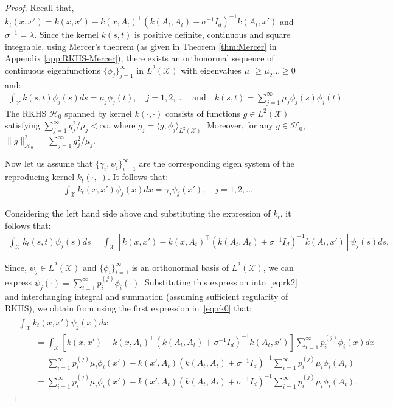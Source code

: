 \documentclass[final,12pt]{colt2026} %
\begin{document}
\begin{proof}
Recall  that, $k_t(x,x')= k(x,x')- k(x,A_t)^\top (k(A_t,A_t)+\sigma^{-1} I_d)^{-1} k(A_t,x')$ and $\sigma^{-1}= \lambda$.  Since the kernel $k(s,t)$ is positive definite, continuous and square integrable, using Mercer's theorem (as given in Theorem \ref{thm:Mercer} in Appendix \ref{app:RKHS-Mercer}), there exists an orthonormal sequence of continuous eigenfunctions $\{\phi_j\}_{j=1}^{\infty}$ in $L^2(\mathcal X)$ with eigenvalues $\mu_1\geq \mu_2\ldots \geq 0$ and:
\begin{align}
    \int_{\mathcal X} k(s,t)\phi_j(s)ds= \mu_j \phi_j(t), \quad j={1,2,\ldots} \quad \text{and} \quad k(s,t)= \sum_{j=1}^{\infty} \mu_j \phi_j(s)\phi_j(t).
    \label{eq:rk0}
\end{align} 
The RKHS $\mathcal H_0$ spanned by kernel $k(\cdot,\cdot)$ consists of functions $g\in L^2(\mathcal X)$ satisfying $\sum_{j=1}^{\infty}{g_j^2}/{\mu_j} < \infty$, where $g_j= \langle g, \phi_j\rangle_{L^2(\mathcal X)}$. Moreover, for any $g\in\mathcal H_0$,  $\|g\|_{\mathcal H_0}^2 = \sum_{j=1}^{\infty}{g_j^2}/{\mu_j}$.

Now let us assume that $\{\gamma_i,\psi_i\}_{i=1}^{\infty}$ are the corresponding eigen system of the reproducing kernel $k_t(\cdot,\cdot)$. It follows that:
\begin{align}
    \int_{\mathcal X} k_t(x,x')\psi_j(x)dx= \gamma_j \psi_j(x'), \quad j={1,2,\ldots}
    \label{eq:rk1}
\end{align}

Considering the left hand side above and substituting the expression of $k_t$, it follows that:
\begin{align}
    \int_{\mathcal X} k_t(s,t)\psi_j(s)ds = \int_{\mathcal X} \left[k(x,x')- k(x,A_t)^\top (k(A_t,A_t)+\sigma^{-1} I_d)^{-1} k(A_t,x')\right]\psi_j(s)ds.
    \label{eq:rk2}
\end{align}

Since, $\psi_j \in L^2(\mathcal X)$ and $\{\phi_i\}_{i=1}^{\infty}$ is an orthonormal basis of $L^2(\mathcal X)$, we can express $\psi_j(\cdot) = \sum_{i=1}^{\infty} p^{(j)}_i  \phi_i(\cdot) $. Substituting this expression into~\eqref{eq:rk2} and interchanging integral and summation (assuming sufficient regularity of RKHS), we obtain from using the first expression in~\eqref{eq:rk0} that:
\begin{align}\label{eq:rk3}
\begin{split}
    &\int_{\mathcal X} k_t(x,x')\psi_j(x)dx\\
    &\qquad = \int_{\mathcal X} \left[k(x,x')- k(x,A_t)^\top (k(A_t,A_t)+\sigma^{-1} I_d)^{-1} k(A_t,x')\right]\sum_{i=1}^{\infty} p^{(j)}_i  \phi_i(x)dx
    \\
    &\qquad = \sum_{i=1}^{\infty} p^{(j)}_i \mu_i \phi_i(x') - k(x', A_t) (k(A_t,A_t)+\sigma^{-1} I_d)^{-1} \sum_{i=1}^{\infty} p^{(j)}_i \mu_i \phi_i(A_t)
    \\
    &\qquad = \sum_{i=1}^{\infty} p^{(j)}_i \mu_i \phi_i(x') - k(x', A_t) (k(A_t,A_t)+\sigma^{-1} I_d)^{-1} \sum_{i=1}^{\infty} p^{(j)}_i \mu_i \phi_i(A_t).
\end{split}
\end{align}


\end{proof}
\end{document}
